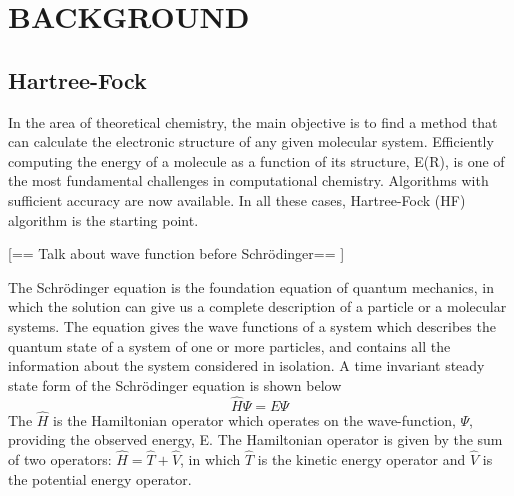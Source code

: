 \documentclass[twoside]{article}
\begin{document}

\section{BACKGROUND}

\subsection{Hartree-Fock}


In the area of theoretical chemistry, the main objective is to find a method that can calculate the electronic structure of any given molecular system. Efficiently computing the energy of a molecule as a function of its structure, E(R), is one of the most fundamental challenges in computational chemistry. Algorithms with sufficient accuracy are now available. In all these cases, Hartree-Fock (HF) algorithm is the starting point.



[== Talk about wave function before Schrödinger== ]

The Schrödinger equation is the foundation equation of quantum mechanics, in which the solution can give us a complete description of a particle or a molecular systems. The equation gives the wave functions of a system which describes the quantum state of a system of one or more particles, and contains all the information about the system considered in isolation. A time invariant steady state form of the Schrödinger equation  is shown below
\[
				\hat{H}\Psi = E\Psi
\]
The $\hat{H}$ is the Hamiltonian operator which operates on the wave-function, $\Psi$, providing the observed energy, E. The Hamiltonian operator is given by the sum of two operators: $\hat{H} = \hat{T} + \hat{V}$,  in which $\hat{T}$ is the kinetic energy operator and $\hat{V}$ is the potential energy operator.
\end{document}
